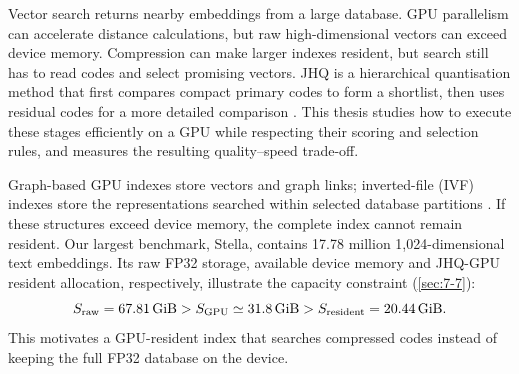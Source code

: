 Vector search returns nearby embeddings from a large database. GPU
parallelism can accelerate distance calculations, but raw high-dimensional
vectors can exceed device memory. Compression can make larger indexes
resident, but search still has to read codes and select promising vectors.
JHQ is a hierarchical quantisation method that first compares compact
primary codes to form a shortlist, then uses residual codes for a more
detailed comparison \cite{jhq}. This thesis studies how to execute these
stages efficiently on a GPU while respecting their scoring and selection
rules, and measures the resulting quality--speed trade-off.

Graph-based GPU indexes store vectors and graph links; inverted-file
(IVF) indexes store the representations searched within selected database
partitions \cite{cagra,johnson_gpu,ivfrabitq}. If these structures exceed
device memory, the complete index cannot remain resident.
Our largest benchmark, Stella, contains 17.78 million 1,024-dimensional
text embeddings. Its raw FP32 storage, available device memory and
JHQ-GPU resident allocation, respectively, illustrate the capacity
constraint (\cref{sec:7-7}):
\[
 S_{\rm raw}=67.81\,\mathrm{GiB}
 >S_{\rm GPU}\simeq31.8\,\mathrm{GiB}
 >S_{\rm resident}=20.44\,\mathrm{GiB}.
\]
This motivates a GPU-resident index that searches compressed codes
instead of keeping the full FP32 database on the device.
